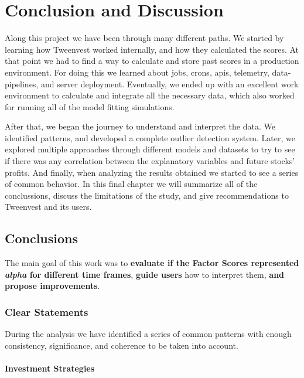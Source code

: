 \documentclass[11pt,english,a4paper,hidelinks]{book}
\begin{document}
\chapter{Conclusion and Discussion}

Along this project we have been through many different paths. We started by learning how Tweenvest worked internally, and how they calculated the scores. At that point we had to find a way to calculate and store past scores in a production environment. For doing this we learned about \acrshort{job}s, \acrshort{cron}s, \acrshort{api}s, telemetry, data-pipelines, and server deployment. Eventually, we ended up with an excellent work environment to calculate and integrate all the necessary data, which also worked for running all of the model fitting simulations.

\vspace{0.5cm}
\noindent After that, we began the journey to understand and interpret the data. We identified patterns, and developed a complete outlier detection system. Later, we explored multiple approaches through different models and datasets to try to see if there was any correlation between the explanatory variables and future stocks' profits. And finally, when analyzing the results obtained we started to see a series of common behavior. In this final chapter we will summarize all of the conclussions, discuss the limitations of the study, and give recommendations to Tweenvest and its users.

\section{Conclusions}

The main goal of this work was to \textbf{evaluate if the Factor Scores represented \textit{alpha} for different time frames}, \textbf{guide users} how to interpret them, \textbf{and propose improvements}.

\subsection{Clear Statements}

\noindent During the analysis we have identified a series of common patterns with enough consistency, significance, and coherence to be taken into account.

\subsubsection{Investment Strategies}
\end{document}
